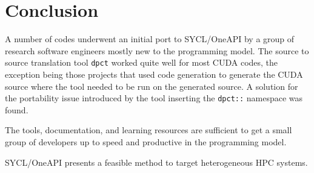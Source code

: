 \documentclass[main]{subfiles}
\begin{document}
\section{Conclusion}\label{sec:conclusion}
A number of codes underwent an initial port to SYCL/OneAPI by a group of research software engineers mostly new to the programming model.
The source to source translation tool \texttt{dpct} worked quite well for most CUDA codes, the exception being those projects that used code generation to generate the CUDA source where the tool needed to be run on the generated source.
A solution for the portability issue introduced by the tool inserting the \texttt{dpct::} namespace was found.

The tools, documentation, and learning resources are sufficient to get a small group of developers up to speed and productive in the programming model.

SYCL/OneAPI presents a feasible method to target heterogeneous HPC systems.
\end{document}
